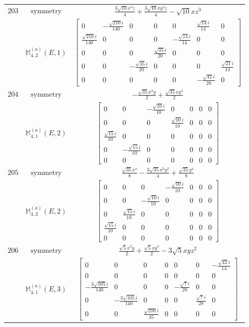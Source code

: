 \documentclass[fleqn,8pt,landscape]{jsarticle}
\begin{document}
\begin{longtable}{ccc}
$ 203 $ & $ \text{symmetry} $ & $ \frac{3 \sqrt{10} x^{3} z}{4} + \frac{3 \sqrt{10} x y^{2} z}{4} - \sqrt{10} x z^{3} $ \\
$  $ & $ \mathbb{M}_{4,2}^{(a)}(E,1) $ & $ \begin{bmatrix} 0 & - \frac{\sqrt{210} i}{140} & 0 & 0 & 0 & \frac{\sqrt{14} i}{14} & 0 \\ \frac{\sqrt{210} i}{140} & 0 & 0 & 0 & - \frac{\sqrt{14} i}{14} & 0 & 0 \\ 0 & 0 & 0 & \frac{\sqrt{35} i}{20} & 0 & 0 & 0 \\ 0 & 0 & - \frac{\sqrt{35} i}{20} & 0 & 0 & 0 & \frac{\sqrt{21} i}{14} \\ 0 & 0 & 0 & 0 & 0 & - \frac{\sqrt{42} i}{28} & 0 \end{bmatrix} $ \\ \hline
$ 204 $ & $ \text{symmetry} $ & $ - \frac{\sqrt{35} x^{3} y}{2} + \frac{\sqrt{35} x y^{3}}{2} $ \\
$  $ & $ \mathbb{M}_{4,1}^{(a)}(E,2) $ & $ \begin{bmatrix} 0 & 0 & - \frac{\sqrt{10} i}{10} & 0 & 0 & 0 & 0 \\ 0 & 0 & 0 & \frac{\sqrt{10} i}{10} & 0 & 0 & 0 \\ \frac{\sqrt{15} i}{10} & 0 & 0 & 0 & 0 & 0 & 0 \\ 0 & - \frac{\sqrt{15} i}{10} & 0 & 0 & 0 & 0 & 0 \\ 0 & 0 & 0 & 0 & 0 & 0 & 0 \end{bmatrix} $ \\ \hline
$ 205 $ & $ \text{symmetry} $ & $ \frac{\sqrt{35} x^{4}}{8} - \frac{3 \sqrt{35} x^{2} y^{2}}{4} + \frac{\sqrt{35} y^{4}}{8} $ \\
$  $ & $ \mathbb{M}_{4,2}^{(a)}(E,2) $ & $ \begin{bmatrix} 0 & 0 & 0 & - \frac{\sqrt{10} i}{10} & 0 & 0 & 0 \\ 0 & 0 & - \frac{\sqrt{10} i}{10} & 0 & 0 & 0 & 0 \\ 0 & \frac{\sqrt{15} i}{10} & 0 & 0 & 0 & 0 & 0 \\ \frac{\sqrt{15} i}{10} & 0 & 0 & 0 & 0 & 0 & 0 \\ 0 & 0 & 0 & 0 & 0 & 0 & 0 \end{bmatrix} $ \\ \hline
$ 206 $ & $ \text{symmetry} $ & $ \frac{\sqrt{5} x^{3} y}{2} + \frac{\sqrt{5} x y^{3}}{2} - 3 \sqrt{5} x y z^{2} $ \\
$  $ & $ \mathbb{M}_{4,1}^{(a)}(E,3) $ & $ \begin{bmatrix} 0 & 0 & 0 & 0 & 0 & 0 & - \frac{\sqrt{42} i}{14} \\ 0 & 0 & 0 & 0 & 0 & 0 & 0 \\ - \frac{3 \sqrt{105} i}{140} & 0 & 0 & 0 & - \frac{\sqrt{7} i}{28} & 0 & 0 \\ 0 & - \frac{3 \sqrt{105} i}{140} & 0 & 0 & 0 & \frac{\sqrt{7} i}{28} & 0 \\ 0 & 0 & \frac{\sqrt{210} i}{35} & 0 & 0 & 0 & 0 \end{bmatrix} $ \\ \hline

\end{longtable}
\end{document}

